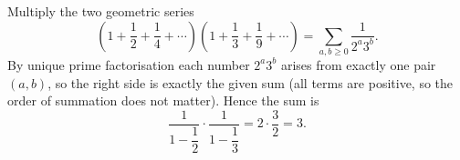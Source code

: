Multiply the two geometric series
\[
\left(1+\dfrac{1}{2}+\dfrac{1}{4}+\cdots\right)\left(1+\dfrac{1}{3}+\dfrac{1}{9}+\cdots\right)=\sum_{a,b\ge0}\dfrac{1}{2^a3^b}.
\]
By unique prime factorisation each number $2^a3^b$ arises from exactly one pair $(a,b)$, so the right side is exactly the given sum (all terms are positive, so the order of summation does not matter). Hence the sum is
\[
\dfrac{1}{1-\dfrac{1}{2}}\cdot\dfrac{1}{1-\dfrac{1}{3}}=2\cdot\dfrac{3}{2}=\boxed{3}.
\]

